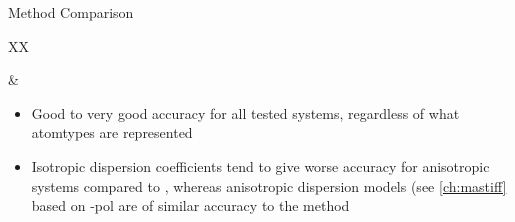 \begin{subsubsection}{Method Comparison}
\begin{table}
\begin{tabu}{XX}
\begin{itemize}[topsep=0pt]
\end{itemize}
& 
\begin{itemize}[topsep=0pt]
\item Good to very good accuracy for all tested systems, regardless of what
atomtypes are represented
\item Isotropic dispersion coefficients tend to give worse accuracy for
anisotropic systems compared to \idma, whereas anisotropic dispersion models
(see \cref{ch:mastiff} based on \isa-pol are of similar accuracy to the \idma
method
\end{itemize}
\\ %
\bottomrule
\end{tabu}
\caption{Comparison between the \idma and \isa-pol methods.}
\label{tab:workflow-dispersion_comparison}
\end{table}

\end{subsubsection}
